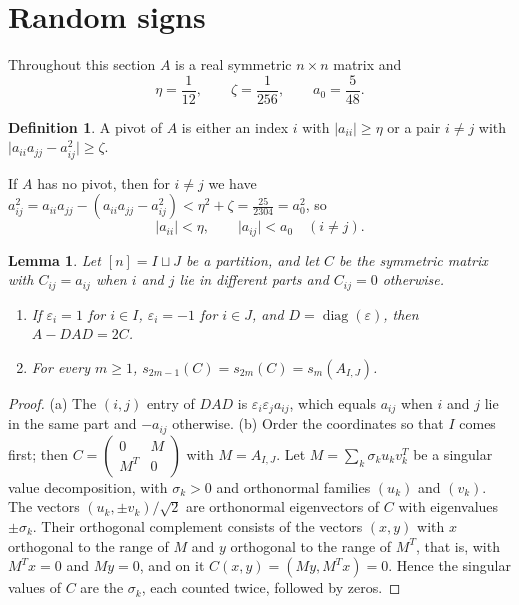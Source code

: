 \documentclass[11pt]{amsart}
\numberwithin{equation}{section}
\newtheorem{lemma}[theorem]{Lemma}
\theoremstyle{definition}
\newtheorem{definition}[theorem]{Definition}
\theoremstyle{remark}
\newcommand{\1}{\mathbf 1}
\DeclareMathOperator{\diag}{diag}
\newcommand{\abs}[1]{\lvert #1\rvert}
\begin{document}
\section{Random signs}\label{sec:signs}

Throughout this section $A$ is a real symmetric $n\times n$ matrix and
\begin{equation}\label{eq:parameters}
\eta=\frac1{12},\qquad\zeta=\frac1{256},\qquad a_0=\frac5{48}.
\end{equation}

\begin{definition}\label{def:pivot}
A pivot of $A$ is either an index $i$ with $\abs{a_{ii}}\ge\eta$ or a pair $i\ne j$ with $\abs{a_{ii}a_{jj}-a_{ij}^2}\ge\zeta$.
\end{definition}

If $A$ has no pivot, then for $i\ne j$ we have $a_{ij}^2=a_{ii}a_{jj}-(a_{ii}a_{jj}-a_{ij}^2)<\eta^2+\zeta=\frac{25}{2304}=a_0^2$, so
\begin{equation}\label{eq:small}
\abs{a_{ii}}<\eta,\qquad\abs{a_{ij}}<a_0\quad(i\ne j).
\end{equation}

\begin{lemma}\label{lem:cross}
Let $[n]=I\sqcup J$ be a partition, and let $C$ be the symmetric matrix with $C_{ij}=a_{ij}$ when $i$ and $j$ lie in different parts and $C_{ij}=0$ otherwise.
\begin{enumerate}
\item[(a)] If $\varepsilon_i=1$ for $i\in I$, $\varepsilon_i=-1$ for $i\in J$, and $D=\diag(\varepsilon)$, then $A-DAD=2C$.
\item[(b)] For every $m\ge1$, $s_{2m-1}(C)=s_{2m}(C)=s_m(A_{I,J})$.
\end{enumerate}
\end{lemma}

\begin{proof}
(a) The $(i,j)$ entry of $DAD$ is $\varepsilon_i\varepsilon_ja_{ij}$, which equals $a_{ij}$ when $i$ and $j$ lie in the same part and $-a_{ij}$ otherwise. (b) Order the coordinates so that $I$ comes first; then $C=\begin{pmatrix}0&M\\M^T&0\end{pmatrix}$ with $M=A_{I,J}$. Let $M=\sum_k\sigma_ku_kv_k^T$ be a singular value decomposition, with $\sigma_k>0$ and orthonormal families $(u_k)$ and $(v_k)$. The vectors $(u_k,\pm v_k)/\sqrt2$ are orthonormal eigenvectors of $C$ with eigenvalues $\pm\sigma_k$. Their orthogonal complement consists of the vectors $(x,y)$ with $x$ orthogonal to the range of $M$ and $y$ orthogonal to the range of $M^T$, that is, with $M^Tx=0$ and $My=0$, and on it $C(x,y)=(My,M^Tx)=0$. Hence the singular values of $C$ are the $\sigma_k$, each counted twice, followed by zeros.
\end{proof}
\end{document}
